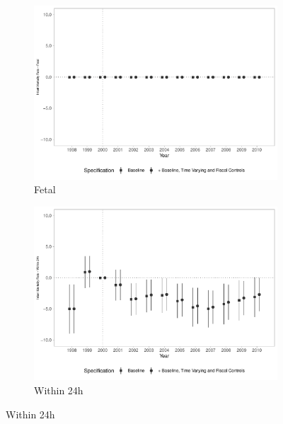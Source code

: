 \begin{figure}[h!]
    \begin{center}
    \caption{Effects on Infant Mortality Rates - By Timing}\label{fig:17}
    \begin{subfigure}{0.48\textwidth}
        \caption{\scriptsize Fetal}\label{fig:17a}
        \centering
        \includegraphics[width=\textwidth]{plots/tx_mi_fet_dist_ec29_baseline_dist_ec29_baseline_17.pdf}
    \end{subfigure}
    \begin{subfigure}{0.48\textwidth}
        \centering
        \caption{\scriptsize Within 24h}\label{fig:17b}
        \includegraphics[width=\textwidth]{plots/tx_mi_24h_dist_ec29_baseline_dist_ec29_baseline_17.pdf}
    \end{subfigure}

\end{center}
\end{figure}
